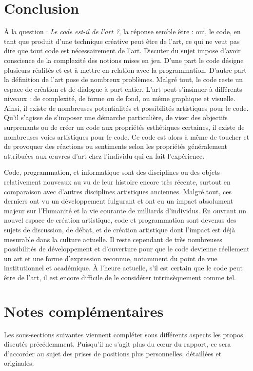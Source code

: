 \documentclass[12pt]{article} %
\begin{document}
\section{Conclusion}
À la question : \textit{Le code est-il de l'art ?}, la réponse semble être : oui, le code, en tant que produit d'une technique créative peut être de l'art, ce qui ne veut pas dire que tout code est nécessairement de l'art. Discuter du sujet impose d'avoir conscience de la complexité des notions mises en jeu. D'une part le code désigne plusieurs réalités et est à mettre en relation avec la programmation. D'autre part la définition de l'art pose de nombreux problèmes. Malgré tout, le code reste un espace de création et de dialogue à part entier. L'art peut s'insinuer à différents niveaux : de complexité, de forme ou de fond, ou même graphique et visuelle. Ainsi, il existe de nombreuses potentialités et possibilités artistiques pour le code. Qu'il s'agisse de s'imposer une démarche particulière, de viser des objectifs surprenants ou de créer un code aux propriétés esthétiques certaines, il existe de nombreuses voies artistiques pour le code. Ce code est alors à même de toucher et de provoquer des réactions ou sentiments selon les propriétés généralement attribuées aux œuvres d'art chez l'individu qui en fait l'expérience.

Code, programmation, et informatique sont des disciplines ou des objets relativement nouveaux au vu de leur histoire encore très récente, surtout en comparaison avec d'autres disciplines artistiques anciennes. Malgré tout, ces derniers ont vu un développement fulgurant et ont eu un impact absolument majeur sur l'Humanité et la vie courante de milliards d'individus. En ouvrant un nouvel espace de création artistique, code et programmation sont devenus des sujets de discussion, de débat, et de création artistique dont l'impact est déjà mesurable dans la culture actuelle. Il reste cependant de très nombreuses possibilités de développement et d'ouverture pour que le code devienne réellement un art et une forme d'expression reconnue, notamment du point de vue institutionnel et académique. À l'heure actuelle, s'il est certain que le code peut être de l'art, il est encore difficile de le considérer intrinsèquement comme tel.

\newpage
\section{Notes complémentaires}
Les sous-sections suivantes viennent compléter sous différents aspects les propos discutés précédemment. Puisqu'il ne s'agit plus du cœur du rapport, ce sera d'accorder au sujet des prises de positions plus personnelles, détaillées et originales. 
\end{document}
